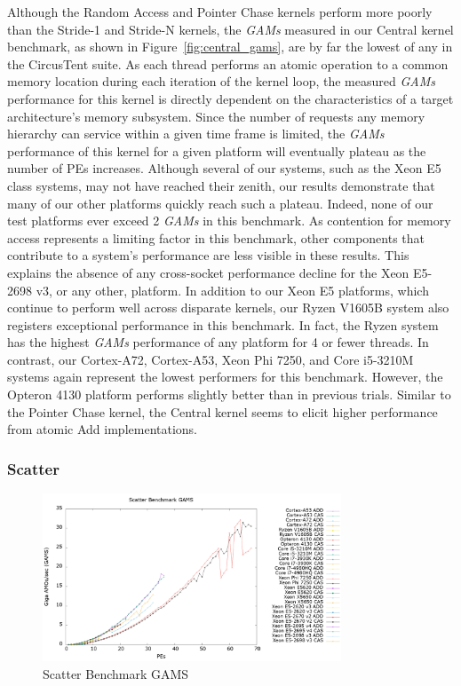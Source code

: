 Although the Random Access and Pointer Chase kernels perform more poorly than the Stride-1 and Stride-N kernels, the \textit{GAMs} measured in our Central kernel benchmark, as shown in Figure~\ref{fig:central_gams}, are by far the lowest of any in the CircusTent suite.
As each thread performs an atomic operation to a common memory location during each iteration of the kernel loop, the measured \textit{GAMs} performance for this kernel is directly dependent on the characteristics of a target architecture's memory subsystem.
Since the number of requests any memory hierarchy can service within a given time frame is limited, the \textit{GAMs} performance of this kernel for a given platform will eventually plateau as the number of PEs increases.
Although several of our systems, such as the Xeon E5 class systems, may not have reached their zenith, our results demonstrate that many of our other platforms quickly reach such a plateau.
Indeed, none of our test platforms ever exceed 2 \textit{GAMs} in this benchmark.
As contention for memory access represents a limiting factor in this benchmark, other components that contribute to a system's performance are less visible in these results.
This explains the absence of any cross-socket performance decline for the Xeon E5-2698 v3, or any other, platform.
In addition to our Xeon E5 platforms, which continue to perform well across disparate kernels, our Ryzen V1605B system also registers exceptional performance in this benchmark.
In fact, the Ryzen system has the highest \textit{GAMs} performance of any platform for 4 or fewer threads.
In contrast, our Cortex-A72, Cortex-A53, Xeon Phi 7250, and Core i5-3210M systems again represent the lowest performers for this benchmark.
However, the Opteron 4130 platform performs slightly better than in previous trials.
Similar to the Pointer Chase kernel, the Central kernel seems to elicit higher performance from atomic Add implementations.

\subsubsection{Scatter}
\label{subsubsec:scatter_res}

\begin{figure}[!t]
\centering
\includegraphics[width=3.5in]{figures/SCATTER_GAMS.png}
\caption{Scatter Benchmark GAMS}
\label{fig:scatter_gams}
\end{figure}

